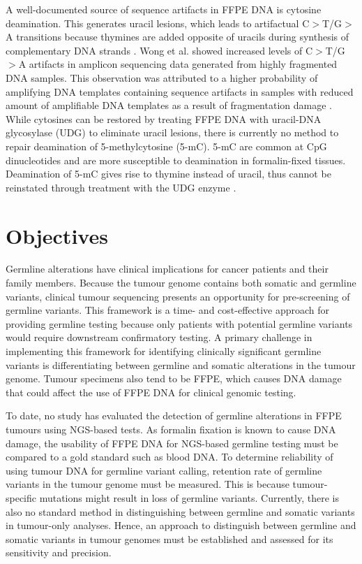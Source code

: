 A well-documented source of sequence artifacts in FFPE DNA is cytosine deamination. This generates uracil lesions, which leads to artifactual C$>$T/G$>$A transitions because thymines are added opposite of uracils during synthesis of complementary DNA strands \cite{Do2015a}. Wong et al. \cite{Wong2014} showed increased levels of C$>$T/G$>$A artifacts in amplicon sequencing data generated from highly fragmented DNA samples. This observation was attributed to a higher probability of amplifying DNA templates containing sequence artifacts in samples with reduced amount of amplifiable DNA templates as a result of fragmentation damage \cite{Wong2014}. While cytosines can be restored by treating FFPE DNA with uracil-DNA glycosylase (\acs{UDG}) to eliminate uracil lesions, there is currently no method to repair deamination of 5-methylcytosine (5-mC). 5-mC are common at CpG dinucleotides and are more susceptible to deamination in formalin-fixed tissues. Deamination of 5-mC gives rise to thymine instead of uracil, thus cannot be reinstated through treatment with the UDG enzyme \cite{Do2015a}.

\section{Objectives}
\label{sec:Objectives}

Germline alterations have clinical implications for cancer patients and their family members. Because the tumour genome contains both somatic and germline variants, clinical tumour sequencing presents an opportunity for pre-screening of germline variants. This framework is a time- and cost-effective approach for providing germline testing because only patients with potential germline variants would require downstream confirmatory testing. A primary challenge in implementing this framework for identifying clinically significant germline variants is differentiating between germline and somatic alterations in the tumour genome. Tumour specimens also tend to be FFPE, which causes DNA damage that could affect the use of FFPE DNA for clinical genomic testing.

To date, no study has evaluated the detection of germline alterations in FFPE tumours using NGS-based tests. As formalin fixation is known to cause DNA damage, the usability of FFPE DNA for NGS-based germline testing must be compared to a gold standard such as blood DNA. To determine reliability of using tumour DNA for germline variant calling, retention rate of germline variants in the tumour genome must be measured. This is because tumour-specific mutations might result in loss of germline variants. Currently, there is also no standard method in distinguishing between germline and somatic variants in tumour-only analyses. Hence, an approach to distinguish between germline and somatic variants in tumour genomes must be established and assessed for its sensitivity and precision.

